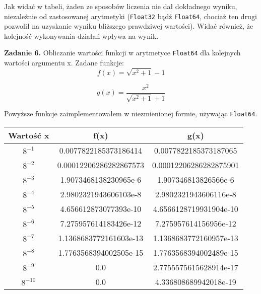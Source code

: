 \documentclass[15pt, a4paper]{article}
\begin{document}
\vspace{0.5cm}

Jak widać w tabeli, żaden ze sposobów liczenia nie dał dokładnego wyniku, niezależnie od zastosowanej arytmetyki (\verb|Float32| bądź \verb|Float64|, chociaż ten drugi pozwolił na uzyskanie wyniku bliższego prawdziwej wartości). Widać również, że kolejność wykonywania działań wpływa na wynik.

\vspace{0.5cm}

\noindent\hrulefill


\vspace{0.5cm}

\noindent\textbf{Zadanie 6.} Obliczanie wartości funkcji w arytmetyce \verb|Float64| dla kolejnych wartości argumentu x. Zadane funkcje:
\[
f(x) = \sqrt{x^2 + 1} - 1
\]

\[
g(x) = \frac{x^2}{\sqrt{x^2 + 1} + 1}
\]

Powyższe funkcje zaimplementowałem w niezmienionej formie, używając \verb|Float64|.


\begin{table}[ht]
    \begin{tabular}{|c|c|c|}
        \hline 
        Wartość x & f(x) & g(x) \\ \hline
        $8^{\mathrm{-1}}$ & 0.0077822185373186414 & 0.0077822185373187065 \\ \hline
        $8^{\mathrm{-2}}$ & 0.00012206286282867573 & 0.00012206286282875901 \\ \hline
        $8^{\mathrm{-3}}$ & 1.9073468138230965e-6 & 1.907346813826566e-6 \\ \hline
        $8^{\mathrm{-4}}$ & 2.9802321943606103e-8 & 2.9802321943606116e-8 \\ \hline
        $8^{\mathrm{-5}}$ & 4.656612873077393e-10 & 4.6566128719931904e-10 \\ \hline
        $8^{\mathrm{-6}}$ & 7.275957614183426e-12 & 7.275957614156956e-12 \\ \hline
        $8^{\mathrm{-7}}$ & 1.1368683772161603e-13 & 1.1368683772160957e-13 \\ \hline
        $8^{\mathrm{-8}}$ & 1.7763568394002505e-15 & 1.7763568394002489e-15 \\ \hline
        $8^{\mathrm{-9}}$ & 0.0 & 2.7755575615628914e-17 \\ \hline
        $8^{\mathrm{-10}}$ & 0.0 & 4.336808689942018e-19 \\ \hline
    \end{tabular}
    \label{tab:fvsg}
\end{table}
\end{document}
